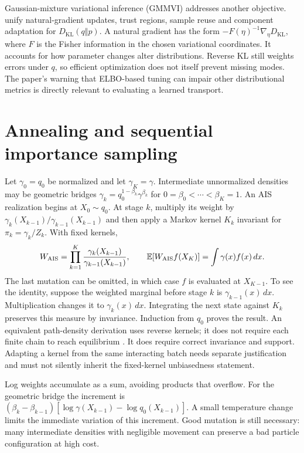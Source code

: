 Gaussian-mixture variational inference (GMMVI) addresses another objective.
\citet[Sections 2--4 and Appendix A]{arenz2023gmmvi} unify natural-gradient
updates, trust regions, sample reuse and component adaptation for
$D_{\mathrm{KL}}(q\Vert p)$. A natural gradient has the form
$-F(\eta)^{-1}\nabla_\eta D_{\mathrm{KL}}$, where $F$ is the Fisher information
in the chosen variational coordinates. It accounts for how parameter changes
alter distributions. Reverse KL still weights errors under $q$, so efficient
optimization does not itself prevent missing modes. The paper's warning that
ELBO-based tuning can impair other distributional metrics is directly relevant
to evaluating a learned transport.

\section{Annealing and sequential importance sampling}
\label{sec:bf-is-ais}

Let $\gamma_0=q_0$ be normalized and let $\gamma_K=\gamma$. Intermediate
unnormalized densities may be geometric bridges
$\gamma_k=q_0^{1-\beta_k}\gamma^{\beta_k}$ for
$0=\beta_0<\cdots<\beta_K=1$. An AIS realization begins at $X_0\sim q_0$.
At stage $k$, multiply its weight by
$\gamma_k(X_{k-1})/\gamma_{k-1}(X_{k-1})$ and then apply a Markov kernel
$K_k$ invariant for $\pi_k=\gamma_k/Z_k$. With fixed kernels,
\begin{equation}
 W_{\rm AIS}=\prod_{k=1}^K
 \frac{\gamma_k(X_{k-1})}{\gamma_{k-1}(X_{k-1})},\qquad
 \mathbb{E}[W_{\rm AIS}f(X_K)]=\int\gamma(x)f(x)\,dx.
 \label{eq:bf-is-ais-identity}
\end{equation}
The last mutation can be omitted, in which case $f$ is evaluated at $X_{K-1}$.
To see the identity, suppose the weighted marginal before stage $k$ is
$\gamma_{k-1}(x)\,dx$. Multiplication changes it to $\gamma_k(x)\,dx$.
Integrating the next state against $K_k$ preserves this measure by invariance.
Induction from $q_0$ proves the result. An equivalent path-density derivation
uses reverse kernels; it does not require each finite chain to reach equilibrium
\citep{neal2001ais}. It does require correct invariance and support. Adapting a
kernel from the same interacting batch needs separate justification and must
not silently inherit the fixed-kernel unbiasedness statement.

Log weights accumulate as a sum, avoiding products that overflow. For the
geometric bridge the increment is
$(\beta_k-\beta_{k-1})[\log\gamma(X_{k-1})-\log q_0(X_{k-1})]$.
A small temperature change limits the immediate variation of this increment.
Good mutation is still necessary: many intermediate densities with negligible
movement can preserve a bad particle configuration at high cost.

